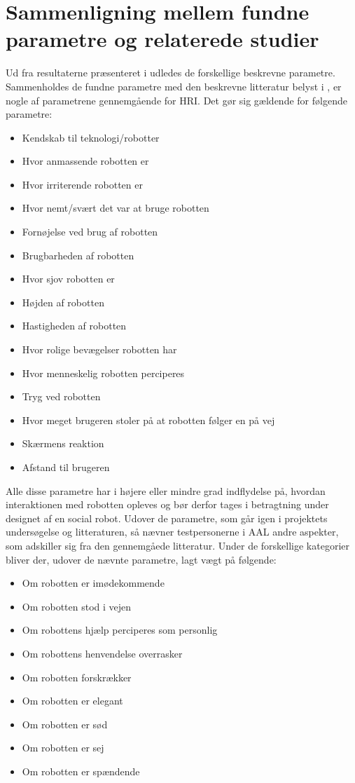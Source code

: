 \section{Sammenligning mellem fundne parametre og relaterede studier}
\label{ParametreTidligereStudier}
%
Ud fra resultaterne præsenteret i  udledes de forskellige beskrevne parametre. Sammenholdes de fundne parametre med den beskrevne litteratur belyst i , er nogle af parametrene gennemgående for HRI. Det gør sig gældende for følgende parametre:
%
\begin{multicols}{2}
	\begin{itemize}
		\item Kendskab til teknologi/robotter
		\item Hvor anmassende robotten er
		\item Hvor irriterende robotten er
		\item Hvor nemt/svært det var at bruge robotten
		\item Fornøjelse ved brug af robotten
		\item Brugbarheden af robotten
		\item Hvor sjov robotten er
		\item Højden af robotten
		\item Hastigheden af robotten
		\item Hvor rolige bevægelser robotten har
		\item Hvor menneskelig robotten perciperes
		\item Tryg ved robotten
		\item Hvor meget brugeren stoler på at robotten følger en på vej
		\item Skærmens reaktion
		\item Afstand til brugeren
	\end{itemize}
\end{multicols}
\noindent
%
Alle disse parametre har i højere eller mindre grad indflydelse på, hvordan interaktionen med robotten opleves og bør derfor tages i betragtning under designet af en social robot. \blankline
%
Udover de parametre, som går igen i projektets undersøgelse og litteraturen, så nævner testpersonerne i AAL andre aspekter, som adskiller sig fra den gennemgåede litteratur. Under de forskellige kategorier bliver der, udover de nævnte parametre, lagt vægt på følgende:
%
\begin{multicols}{2}
	\begin{itemize}
		\item Om robotten er imødekommende
		\item Om robotten stod i vejen
		\item Om robottens hjælp perciperes som personlig
		\item Om robottens henvendelse overrasker
		\item Om robotten forskrækker
		\item Om robotten er elegant
		\item Om robotten er sød
		\item Om robotten er sej
		\item Om robotten er spændende
	\end{itemize}
\end{multicols}
